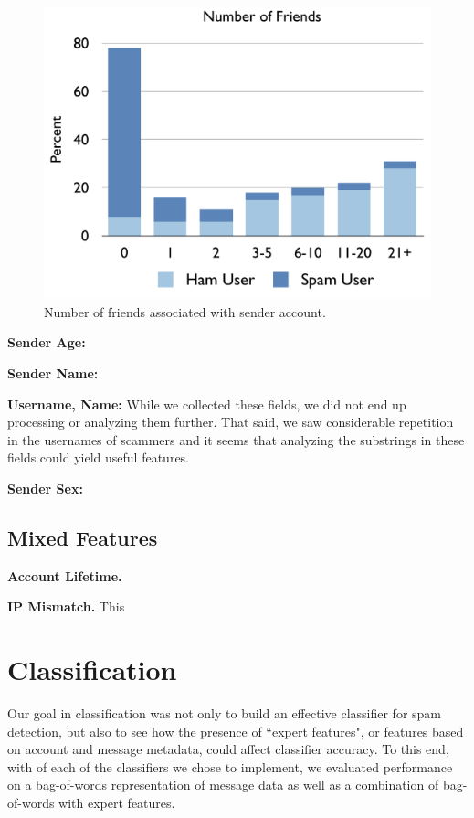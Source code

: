 \documentclass[preprint]{acm_proc_article-sp}
\begin{document}
\begin{figure}[h]
    \centering
    \includegraphics[width=\linewidth]{figures/friends.pdf}
    \caption{Number of friends associated with sender account.}
    \label{fig:friends}
\end{figure}



\textbf{Sender Age:}

\textbf{Sender Name:}


\textbf{Username, Name:} While we collected these fields, we did not end up processing or analyzing them further. That said, we saw considerable repetition in the usernames of scammers and it seems that analyzing the substrings in these fields could yield useful features.

\textbf{Sender Sex:}

\subsection{Mixed Features}

\textbf{Account Lifetime.}

\textbf{IP Mismatch.} This 


\section{Classification}

Our goal in classification was not only to build an effective classifier for spam detection, but also to see how the presence of ``expert features", or features based on account and message metadata, could affect classifier accuracy. To this end, with of each of the classifiers we chose to implement, we evaluated performance on a bag-of-words representation of message data as well as a combination of bag-of-words with expert features.
\end{document}
